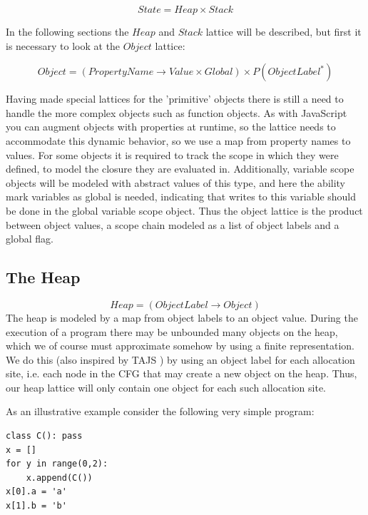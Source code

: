 \begin{equation*}
State = Heap \times Stack
\end{equation*}

In the following sections the $Heap$ and $Stack$ lattice will be described, but first it is necessary to look at the $Object$ lattice:

\begin{equation*}
Object = (PropertyName \rightarrow Value \times Global) \times P(ObjectLabel^{*})
\end{equation*}

Having made special lattices for the 'primitive' objects there is still a need to handle the more complex objects such as function objects. As with JavaScript you can augment objects with properties at runtime, so the lattice needs to accommodate this dynamic behavior, so we use a map from property names to values. For some objects it is required to track the scope in which they were defined, to model the closure they are evaluated in. Additionally, variable scope objects will be modeled with abstract values of this type, and here the ability mark variables as global is needed, indicating that writes to this variable should be done in the global variable scope object. Thus the object lattice is the product between object values, a scope chain modeled as a list of object labels and a global flag.

\subsection{The Heap}
\label{The Heap}
\begin{equation*}
Heap = (ObjectLabel \rightarrow Object)
\end{equation*}
The heap is modeled by a map from object labels to an object value. During the execution of a program there may be unbounded many objects on the heap, which we of course must approximate somehow by using a finite representation. We do this (also inspired by TAJS \cite{tajs}) by using an object label for each allocation site, i.e. each node in the CFG that may create a new object on the heap. Thus, our heap lattice will only contain one object for each such allocation site.

As an illustrative example consider the following very simple program:

\begin{listing}[H]
	\begin{verbatim}
class C(): pass
x = []
for y in range(0,2):
	x.append(C())
x[0].a = 'a'
x[1].b = 'b'
	\end{verbatim}
\end{listing}

